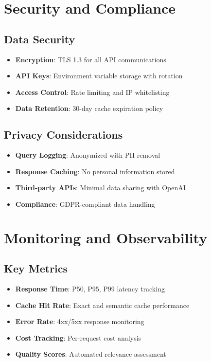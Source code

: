 \documentclass[11pt,a4paper]{article}
\begin{document}
\section{Security and Compliance}

\subsection{Data Security}

\begin{itemize}
    \item \textbf{Encryption}: TLS 1.3 for all API communications
    \item \textbf{API Keys}: Environment variable storage with rotation
    \item \textbf{Access Control}: Rate limiting and IP whitelisting
    \item \textbf{Data Retention}: 30-day cache expiration policy
\end{itemize}

\subsection{Privacy Considerations}

\begin{itemize}
    \item \textbf{Query Logging}: Anonymized with PII removal
    \item \textbf{Response Caching}: No personal information stored
    \item \textbf{Third-party APIs}: Minimal data sharing with OpenAI
    \item \textbf{Compliance}: GDPR-compliant data handling
\end{itemize}

\section{Monitoring and Observability}

\subsection{Key Metrics}

\begin{itemize}
    \item \textbf{Response Time}: P50, P95, P99 latency tracking
    \item \textbf{Cache Hit Rate}: Exact and semantic cache performance
    \item \textbf{Error Rate}: 4xx/5xx response monitoring
    \item \textbf{Cost Tracking}: Per-request cost analysis
    \item \textbf{Quality Scores}: Automated relevance assessment
\end{itemize}
\end{document}
